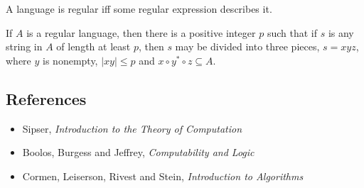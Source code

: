 \begin{thm}
  A language is regular iff some regular expression describes it.
\end{thm}
\begin{prop}
  If $A$ is a regular language, then there is a positive integer $p$ such that
  if $s$ is any string in $A$ of length at least $p$, then $s$ may be divided
  into three pieces, $s=xyz$, where $y$ is nonempty, $|xy|\le p$ and $x\circ
  y^*\circ z\subseteq A$.
\end{prop}
\subsection*{References}
\begin{itemize}
  \item Sipser, \emph{Introduction to the Theory of Computation}
  \item Boolos, Burgess and Jeffrey, \emph{Computability and Logic}
  \item Cormen, Leiserson, Rivest and Stein, \emph{Introduction to Algorithms}
\end{itemize}
